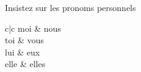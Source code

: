 \documentclass[../templates/main.tex]{subfiles}
\begin{document}
\begin{grammar}{Insistez sur les pronoms personnels}
	\begin{tblr}{c|c} %
		moi  & nous  \\
		toi  & vous  \\
		lui  & eux   \\
		elle & elles \\
	\end{tblr}
\end{grammar}
\end{document}
